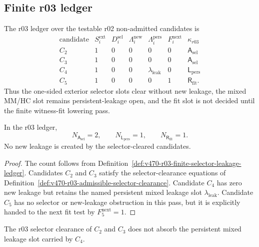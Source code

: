 \subsection{Finite r03 ledger}
\label{subsec:v470-r03-finite-ledger}

\begin{definition}
\label{def:v470-r03-finite-selector-leakage-ledger}
The r03 ledger over the testable r02 non-admitted candidates is
\[
\begin{array}{c|c|c|c|c|c|c}
\text{candidate} & S_i^{\mathrm{ext}} & D_i^{\mathrm{sel}} &
\Lambda_i^{\mathrm{new}} & \Lambda_i^{\mathrm{pers}} & F_i^{\mathrm{next}} &
\kappa_{r03} \\
\hline
C_2 & 1 & 0 & 0 & 0 & 0 & \mathsf A_{\mathrm{sel}} \\
C_3 & 1 & 0 & 0 & 0 & 0 & \mathsf A_{\mathrm{sel}} \\
C_4 & 1 & 0 & 0 & \lambda_{\mathrm{leak}} & 0 & \mathsf L_{\mathrm{pers}} \\
C_5 & 1 & 0 & 0 & 0 & 1 & \mathsf R_{\mathrm{fit}}.
\end{array}
\]
Thus the one-sided exterior selector slots clear without new leakage, the mixed
MM/HC slot remains persistent-leakage open, and the fit slot is not decided until
the finite witness-fit lowering pass.
\end{definition}

\begin{proposition}
\label{prop:v470-r03-selector-clearance-count}
In the r03 ledger,
\[
N_{\mathsf A_{\mathrm{sel}}}=2,
\qquad
N_{\mathsf L_{\mathrm{pers}}}=1,
\qquad
N_{\mathsf R_{\mathrm{fit}}}=1.
\]
No new leakage is created by the selector-cleared candidates.
\end{proposition}

\begin{proof}
The count follows from Definition~\ref{def:v470-r03-finite-selector-leakage-ledger}.
Candidates \(C_2\) and \(C_3\) satisfy the selector-clearance equations of
Definition~\ref{def:v470-r03-admissible-selector-clearance}. Candidate \(C_4\)
has zero new leakage but retains the named persistent mixed leakage slot
\(\lambda_{\mathrm{leak}}\). Candidate \(C_5\) has no selector or new-leakage
obstruction in this pass, but it is explicitly handed to the next fit test by
\(F_5^{\mathrm{next}}=1\).
\end{proof}

\begin{lemma}
\label{lem:v470-r03-clearance-does-not-absorb-mixed-leakage}
The r03 selector clearance of \(C_2\) and \(C_3\) does not absorb the persistent
mixed leakage slot carried by \(C_4\).
\end{lemma}

